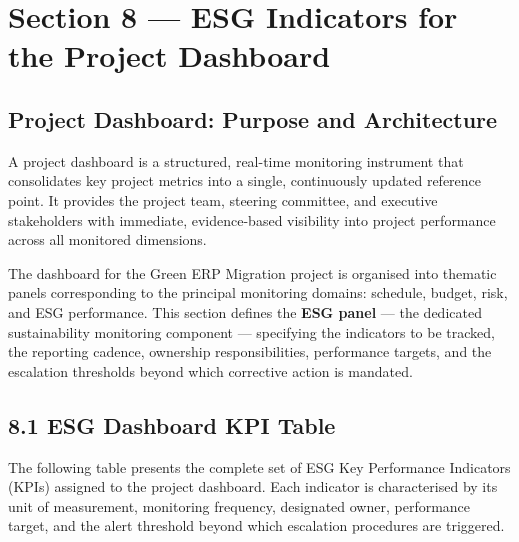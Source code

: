 

\chapter{Section 8 --- ESG Indicators for the Project Dashboard}

\section{Project Dashboard: Purpose and Architecture}

A project dashboard is a structured, real-time monitoring instrument that
consolidates key project metrics into a single, continuously updated
reference point. It provides the project team, steering committee, and
executive stakeholders with immediate, evidence-based visibility into
project performance across all monitored dimensions.

The dashboard for the Green ERP Migration project is organised into
thematic panels corresponding to the principal monitoring domains:
schedule, budget, risk, and ESG performance. This section defines the
\textbf{ESG panel} --- the dedicated sustainability monitoring component
--- specifying the indicators to be tracked, the reporting cadence,
ownership responsibilities, performance targets, and the escalation
thresholds beyond which corrective action is mandated.

\section{8.1 ESG Dashboard KPI Table}

The following table presents the complete set of ESG Key Performance
Indicators (KPIs) assigned to the project dashboard. Each indicator is
characterised by its unit of measurement, monitoring frequency, designated
owner, performance target, and the alert threshold beyond which escalation
procedures are triggered.


